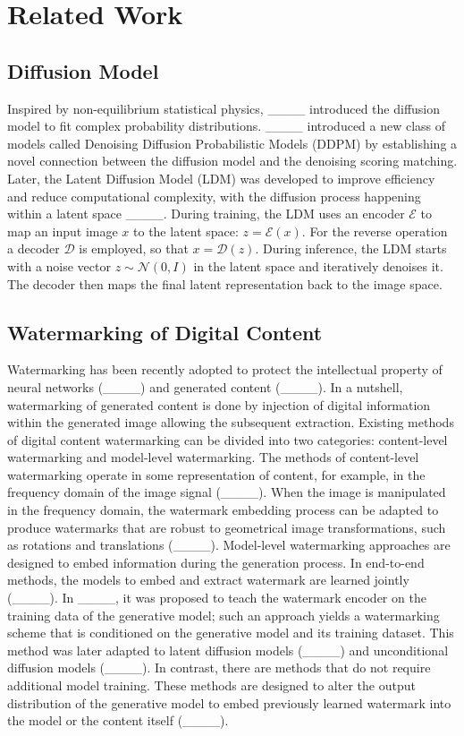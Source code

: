 \section{Related Work}
\subsection{Diffusion Model}

Inspired by non-equilibrium statistical physics, ____ introduced the diffusion model to fit complex probability distributions. ____ introduced a new class of models called Denoising Diffusion Probabilistic Models (DDPM) by establishing a novel connection between the diffusion model and the denoising scoring matching. Later, the Latent Diffusion Model (LDM)  was developed to improve efficiency and reduce computational complexity, with the diffusion process happening within a latent space   ____. During training, the LDM uses an encoder $\mathcal{E}$ to map an input image $x$ to the latent space: $z = \mathcal{E}(x)$. For the reverse operation a decoder $\mathcal{D}$ is employed, so that $x = \mathcal{D}(z)$. During inference, the LDM starts with a noise vector $z \sim \mathcal{N}(0, I)$ in the latent space and iteratively denoises it. The decoder then maps the final latent representation back to the image space.

\subsection{Watermarking of Digital Content}
Watermarking has been recently adopted to protect the intellectual property of neural networks (____) and generated content (____). In a nutshell, watermarking of generated content is done by injection of digital information within the generated image allowing the subsequent extraction.  Existing methods of digital content watermarking can be divided into two categories: content-level watermarking and model-level watermarking. The methods of content-level watermarking operate in some representation of content, for example, in the frequency domain of the image signal (____). When the image is manipulated in the frequency domain, the watermark embedding process can be adapted to produce watermarks that are robust to geometrical image transformations, such as rotations and translations (____). Model-level watermarking approaches are designed to embed information during the generation process. In end-to-end methods, the models to embed and extract watermark are learned jointly (____). In ____, it was proposed to teach the watermark encoder on the training data of the generative model; such an approach yields a watermarking scheme that is conditioned on the generative model and its training dataset. This method was later adapted to latent diffusion models (____) and unconditional diffusion models (____). In contrast, there are methods that do not require additional model training. These methods are designed to alter the output distribution of the generative model to embed previously learned watermark into the model or the content itself (____). 


